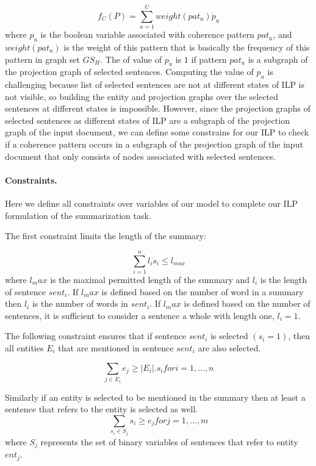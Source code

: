 \begin{equation}
f_C(P) = \sum_{u=1}^{U}{weight(pat_u) \dot p_u}
\end{equation}
where $p_u$ is the boolean variable associated with coherence pattern $pat_u$, and $weight(pat_u)$ is the weight of this pattern that is basically the frequency of this pattern in graph set $GS_H$. 
The of value of $p_u$ is $1$ if pattern $pat_u$ is a subgraph of the projection graph of selected sentences. 
Computing the value of $p_u$ is challenging because list of selected sentences are not at different states of ILP is not visible, so building the entity  and projection graphs over the selected sentences at different states is impossible. 
However, since the projection graphs of selected sentences as different states of ILP are a subgraph of the projection graph of the input document, we can define some constrains for our ILP to check if a coherence pattern occurs in a subgraph of the projection graph of the input document that only consists of nodes associated with selected sentences. 

\paragraph{Constraints.}
Here we define all constraints over variables of our model to complete our ILP formulation of the summarization task. 

The first constraint limits the length of the summary:

\begin{equation}
\sum_{i=1}^{n} l_i \dot s_i \le l_{max}
\end{equation}
where $l_max$ is the maximal permitted length of the summary and $l_i$ is the length of sentence $sent_i$. 
If $l_max$ is defined based on the number of word in a summary then $l_i$ is the number of words in $sent_i$.  
If $l_max$ is defined based on the number of sentences, it is sufficient to consider a sentence a whole with length one, $l_i=1$. 

The following constraint ensures that if sentence $sent_i$ is selected $(s_i = 1)$, then all entities $E_i$ that are mentioned in sentence $sent_i$ are also selected. 

\begin{equation}
\sum_{j\in E_i} {e_j  \ge |E_i|.s_i} for i = 1,...,n
\end{equation}

Similarly if an entity is selected to be mentioned in the summary then at least a sentence that refers to the entity is selected as well.  
\begin{equation}
\sum_{s_i \in S_j}{s_i \ge e_j} for j = 1,...,m
\end{equation}
where $S_j$ represents the set of binary variables of sentences that refer to entity $ent_j$. 


